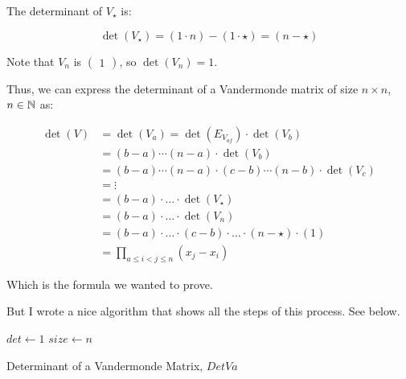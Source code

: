 \documentclass{report}
\begin{document}
{The determinant of \(V_{\star}\) is:

\[
	\det(V_{\star}) = (1 \cdot n) - (1 \cdot \star) = (n - \star)
\]

Note that \(V_{n}\) is \(\begin{pmatrix} 1 \end{pmatrix}\), so \(\det(V_{n}) = 1\).

Thus, we can express the determinant of a Vandermonde matrix of size \(n \times n\), \(n \in \NN\)  as:

\begin{align*}
	\det(V) & = \det(V_{a}) = \det(E_{V_{af}}) \cdot \det(V_{b})                         \\
	        & = (b - a) \cdots (n - a) \cdot \det(V_{b})                                 \\
	        & = (b - a) \cdots (n - a) \cdot (c - b) \cdots (n - b) \cdot \det(V_{c})    \\
	        & = \vdots                                                                   \\
	        & = (b-a) \cdot \ldots \cdot \det(V_{\star})                                 \\
	        & = (b-a) \cdot \ldots \cdot \det(V_{n})                                     \\
	        & = (b-a) \cdot \ldots \cdot  (c-b) \cdot \ldots \cdot (n - \star) \cdot (1) \\
	        & = \prod_{a \leq i < j \leq n} (x_{j} - x_{i})
\end{align*}

Which is the formula we wanted to prove.

But I wrote a nice algorithm that shows all the steps of this process. See below.

\begin{algorithm}[H]
	\vspace{5mm}
	\SetAlgoLined{}
	\(det \gets 1\)\;
	\(size \gets n\)\;
	 
	\caption{Determinant of a Vandermonde Matrix, \(DetVa\) }
\end{algorithm}
}
\end{document}
